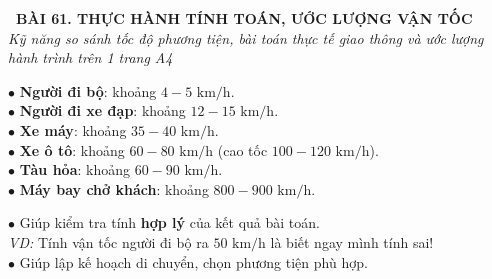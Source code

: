 \documentclass[14pt,a4paper,oneside]{extbook}
\begin{document}
\noindent
\begin{tcolorbox}[
  enhanced,
  colback=teal!8!white,
  colframe=teal!80!black,
  arc=3mm,
  boxrule=1.1pt,
  width=\linewidth,
  halign=center,
  top=2.2mm, bottom=2.2mm,
  left=3mm, right=3mm,
  drop fuzzy shadow
]
  {\large\bfseries\color{teal!95!black}\faBookmark\ BÀI 61. THỰC HÀNH TÍNH TOÁN, ƯỚC LƯỢNG VẬN TỐC}\\[2pt]
  {\scriptsize\color{black!75}\itshape Kỹ năng so sánh tốc độ phương tiện, bài toán thực tế giao thông và ước lượng hành trình trên 1 trang A4}
\end{tcolorbox}

\vspace{3.2mm}
\noindent
\begin{minipage}[t]{0.56\textwidth}
  \begin{tcolorbox}[
    enhanced,
    title={\footnotesize\bfseries\color{white}\faTachometer\ 1. Vận tốc ước lượng của các đối tượng},
    colback=blue!2!white,
    colframe=blue!75!black,
    arc=2.5mm, boxrule=0.8pt, top=1.8mm, bottom=1.8mm, left=2.2mm, right=2.2mm
  ]
    \footnotesize
    $\bullet$ \textbf{Người đi bộ}: khoảng $4 - 5\text{ km/h}$.\\
    $\bullet$ \textbf{Người đi xe đạp}: khoảng $12 - 15\text{ km/h}$.\\
    $\bullet$ \textbf{Xe máy}: khoảng $35 - 40\text{ km/h}$.\\
    $\bullet$ \textbf{Xe ô tô}: khoảng $60 - 80\text{ km/h}$ (cao tốc $100 - 120\text{ km/h}$).\\
    $\bullet$ \textbf{Tàu hỏa}: khoảng $60 - 90\text{ km/h}$.\\
    $\bullet$ \textbf{Máy bay chở khách}: khoảng $800 - 900\text{ km/h}$.
  \end{tcolorbox}
\end{minipage}%
\hfill
\begin{minipage}[t]{0.42\textwidth}
  \begin{tcolorbox}[
    enhanced,
    title={\footnotesize\bfseries\color{white}\faCheckCircle\ 2. Ý nghĩa ước lượng},
    colback=teal!2!white,
    colframe=teal!75!black,
    arc=2.5mm, boxrule=0.8pt, top=1.8mm, bottom=1.8mm, left=2mm, right=2mm
  ]
    \footnotesize
    $\bullet$ Giúp kiểm tra tính \textbf{hợp lý} của kết quả bài toán.\\
    \textit{VD:} Tính vận tốc người đi bộ ra $50\text{ km/h}$ là biết ngay mình tính sai!\\
    $\bullet$ Giúp lập kế hoạch di chuyển, chọn phương tiện phù hợp.
  \end{tcolorbox}
\end{minipage}
\end{document}

